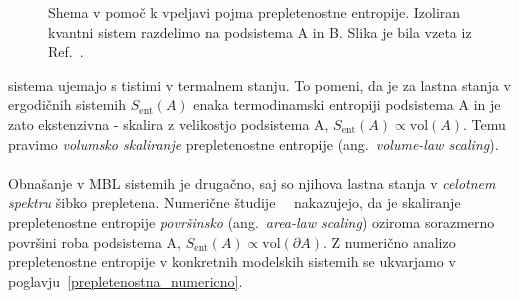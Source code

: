 \begin{minipage}[t]{0.32\textwidth}
\begin{figure}[H]
\caption{
Shema v pomoč k vpeljavi pojma prepletenostne entropije. Izoliran kvantni sistem razdelimo na podsistema A in B.
Slika je bila vzeta iz Ref.~\cite{nandkishore2015many}. 
}
\label{fig:nandkishore_huse_subsystems}
\end{figure}
\end{minipage}
  sistema 
ujemajo s tistimi v termalnem stanju.
To pomeni, da je za lastna stanja v ergodičnih sistemih $S_\mathrm{ent}(A)$ enaka termodinamski entropiji podsistema A in je zato ekstenzivna - skalira z velikostjo
podsistema A, $S_\mathrm{ent}(A)\propto \mathrm{vol}(A).$ Temu pravimo \emph{volumsko skaliranje} prepletenostne entropije (ang.~\emph{volume-law scaling}). \\\\Obnašanje v 
MBL sistemih je drugačno, saj so njihova lastna stanja v \emph{celotnem spektru} šibko prepletena. Numerične študije~\cite{serbyn2013local}~\cite{bauer2013area} nakazujejo, da je skaliranje prepletenostne entropije \emph{površinsko} (ang.~\emph{area-law scaling}) oziroma sorazmerno površini roba podsistema A, $S_\mathrm{ent}(A)\propto \mathrm{vol}(\partial A)$. Z numerično analizo prepletenostne entropije v konkretnih modelskih sistemih se ukvarjamo v poglavju~\ref{prepletenostna_numericno}.

